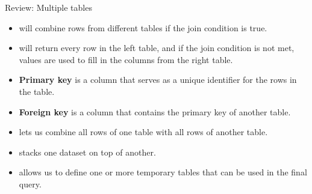 \documentclass{beamer}
\begin{document}
\begin{frame}{Review: Multiple tables}
\begin{itemize}\small
  \item {} will combine rows from different tables if the join condition is true.
  \item {} will return every row in the left table, and if the join condition
        is not met,  values are used to fill in the columns from the right table.
  \item \textbf{Primary key} is a column that serves as a unique identifier for the rows in the table.
  \item \textbf{Foreign key} is a column that contains the primary key of another table.
  \item {} lets us combine all rows of one table with all rows of another table.
  \item {} stacks one dataset on top of another.
  \item {} allows us to define one or more temporary tables that can be used in the final query.
\end{itemize}
\end{frame}
\end{document}
